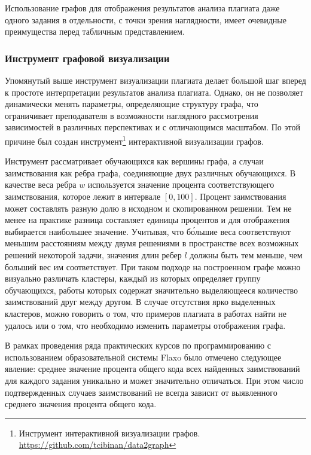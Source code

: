 \documentclass[a4paper,14pt]{extarticle}
\begin{document}
Использование графов для отображения результатов анализа плагиата даже одного задания в отдельности, с точки зрения наглядности, имеет очевидные преимущества перед табличным представлением.

\subsubsection{Инструмент графовой визуализации}

Упомянутый выше инструмент визуализации плагиата делает большой шаг вперед к простоте интерпретации результатов анализа плагиата. Однако, он не позволяет динамически менять параметры, определяющие структуру графа, что ограничивает преподавателя в возможности наглядного рассмотрения зависимостей в различных перспективах и с отличающимся масштабом. По этой причине был создан инструмент\footnote{Инструмент интерактивной визуализации графов. \url{https://github.com/tcibinan/data2graph}} интерактивной визуализации графов.

Инструмент рассматривает обучающихся как вершины графа, а случаи заимствования как ребра графа, соединяющие двух различных обучающихся. В качестве веса ребра $w$ используется значение процента соответствующего заимствования, которое лежит в интервале $[0,100]$. Процент заимствования может составлять разную долю в исходном и скопированном решении. Тем не менее на практике разница составляет единицы процентов и для отображения выбирается наибольшее значение. Учитывая, что б\'{о}льшие веса соответствуют меньшим расстояниям между двумя решениями в пространстве всех возможных решений некоторой задачи, значения длин ребер $l$ должны быть тем меньше, чем больший вес им соответствует. При таком подходе на построенном графе можно визуально различать кластеры, каждый из которых определяет группу обучающихся, работы которых содержат значительно выделяющееся количество заимствований друг между другом. В случае отсутствия ярко выделенных кластеров, можно говорить о том, что примеров плагиата в работах найти не удалось или о том, что необходимо изменить параметры отображения графа.

В рамках проведения ряда практических курсов по программированию с использованием образовательной системы Flaxo было отмечено следующее явление: среднее значение процента общего кода всех найденных заимствований для каждого задания уникально и может значительно отличаться. При этом число подтвержденных случаев заимствований не всегда зависит от выявленного среднего значения процента общего кода.
\end{document}
